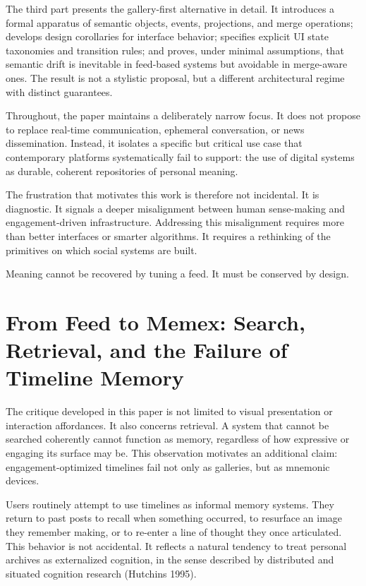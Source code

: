 \documentclass[11pt,oneside]{article}
\begin{document}
The third part presents the gallery-first alternative in detail. It introduces a formal apparatus of semantic objects, events, projections, and merge operations; develops design corollaries for interface behavior; specifies explicit UI state taxonomies and transition rules; and proves, under minimal assumptions, that semantic drift is inevitable in feed-based systems but avoidable in merge-aware ones. The result is not a stylistic proposal, but a different architectural regime with distinct guarantees.

Throughout, the paper maintains a deliberately narrow focus. It does not propose to replace real-time communication, ephemeral conversation, or news dissemination. Instead, it isolates a specific but critical use case that contemporary platforms systematically fail to support: the use of digital systems as durable, coherent repositories of personal meaning.

The frustration that motivates this work is therefore not incidental. It is diagnostic. It signals a deeper misalignment between human sense-making and engagement-driven infrastructure. Addressing this misalignment requires more than better interfaces or smarter algorithms. It requires a rethinking of the primitives on which social systems are built.

Meaning cannot be recovered by tuning a feed. It must be conserved by design.

\section{From Feed to Memex: Search, Retrieval, and the Failure of Timeline Memory}

The critique developed in this paper is not limited to visual presentation or interaction affordances. It also concerns retrieval. A system that cannot be searched coherently cannot function as memory, regardless of how expressive or engaging its surface may be. This observation motivates an additional claim: engagement-optimized timelines fail not only as galleries, but as mnemonic devices.

Users routinely attempt to use timelines as informal memory systems. They return to past posts to recall when something occurred, to resurface an image they remember making, or to re-enter a line of thought they once articulated. This behavior is not accidental. It reflects a natural tendency to treat personal archives as externalized cognition, in the sense described by distributed and situated cognition research (Hutchins 1995).
\end{document}
